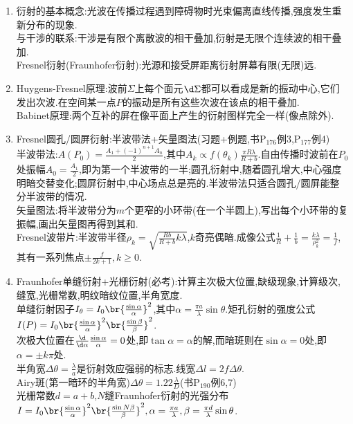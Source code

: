 \documentclass{article}
\begin{document}
\begin{enumerate}
    \item 衍射的基本概念:光波在传播过程遇到障碍物时光束偏离直线传播,强度发生重新分布的现象.\\
    与干涉的联系:干涉是有限个离散波的相干叠加,衍射是无限个连续波的相干叠加.\\
    Fresnel衍射(Fraunhofer衍射):光源和接受屏距离衍射屏幕有限(无限)远.
    \item Huygens-Fresnel原理:波前$\Sigma$上每个面元$\d \Sigma$都可以看成是新的振动中心,它们发出次波.在空间某一点$P$的振动是所有这些次波在该点的相干叠加.\\
    Babinet原理:两个互补的屏在像平面上产生的衍射图样完全一样(像点除外).
    \item Fresnel圆孔/圆屏衍射:半波带法+矢量图法(习题+例题,书P$_{176}$例3,P$_{177}$例4)\\
    半波带法:$A(P_0)=\frac{A_1+(-1)^{n+1}A_n}{2}$,其中$A_k\propto f(\theta_k)\frac{\pi R\lambda}{R+b}$.自由传播时波前在$P_0$处振幅$A_0=\frac{A_1}{2}$,即为第一个半波带的一半;圆孔衍射中,随着圆孔增大,中心强度明暗交替变化;圆屏衍射中,中心场点总是亮的.半波带法只适合圆孔/圆屏能整分半波带的情况.\\
    矢量图法:将半波带分为$m$个更窄的小环带(在一个半圆上),写出每个小环带的复振幅,画出矢量图再得到其和.\\
    Fresnel波带片:半波带半径$\rho_k=\sqrt{\frac{Rb}{R+b}k\lambda}$,$k$奇亮偶暗.成像公式$\frac{1}{R}+\frac{1}{b}=\frac{k\lambda}{\rho_k^2}=\frac{1}{f}$,其有一系列焦点$\pm\frac{f}{2k+1},k\geq 0$.
    \item Fraunhofer单缝衍射+光栅衍射(必考):计算主次极大位置,缺级现象,计算级次,缝宽,光栅常数,明纹暗纹位置,半角宽度.\\
    单缝衍射因子$I_\theta=I_0\br{\frac{\sin\alpha}{\alpha}}^2$,其中$\alpha=\frac{\pi a}{\lambda}\sin \theta$.矩孔衍射的强度公式$I(P)=I_0\br{\frac{\sin \alpha}{\alpha}}^2\br{\frac{\sin\beta}{\beta}}^2$.\\
    次极大位置在$\frac{\d}{\d \alpha}\frac{\sin \alpha}{\alpha}=0$处,即$\tan \alpha=\alpha$的解,而暗斑则在$\sin \alpha=0$处,即$\alpha=\pm k\pi$处.\\
    半角宽$\Delta\theta=\frac{\lambda}{a}$是衍射效应强弱的标志.线宽$\Delta l=2f\Delta\theta$.\\
    Airy斑(第一暗环的半角宽)$\Delta\theta=1.22\frac{\lambda}{D}$(书P$_{190}$例6,7)\\
    光栅常数$d=a+b$,$N$缝Fraunhofer衍射的光强分布$I=I_0\br{\frac{\sin\alpha}{\alpha}}^2\br{\frac{\sin N\beta}{\beta}}^2, \alpha=\frac{\pi a}{\lambda},\beta=\frac{\pi d}{\lambda}\sin\theta$.\\

\end{enumerate}
\end{document}
